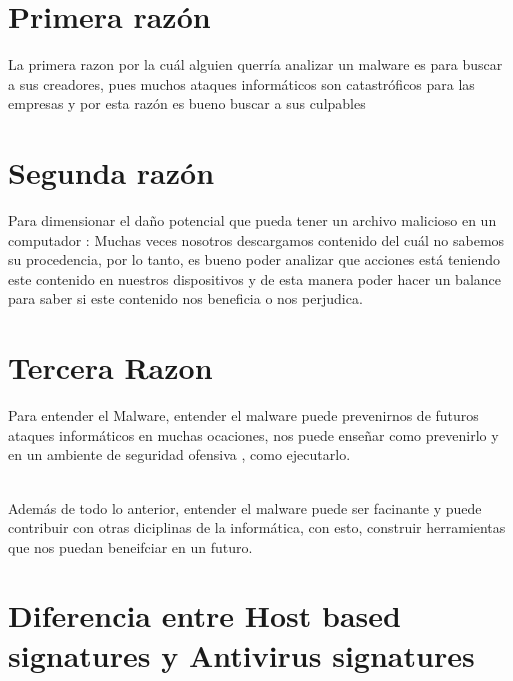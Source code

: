 \documentclass[10pt,a4paper]{article} %
\begin{document}
    \title{\rmfamily\normalfont{}}
    \author{}
    \date{\today} 
    
    \maketitle
     

    \section{Primera razón}

        La primera razon por la cuál alguien querría analizar un malware es
        para buscar a sus creadores, pues muchos ataques informáticos son
        catastróficos para las empresas y por esta razón es bueno buscar a sus
        culpables

    \section{Segunda razón}

        Para dimensionar el daño potencial que pueda tener un archivo malicioso
        en un computador : Muchas veces nosotros descargamos contenido del cuál
        no sabemos su procedencia, por lo tanto, es bueno poder analizar que
        acciones está teniendo este contenido en nuestros dispositivos y de
        esta manera poder hacer un balance para saber si este contenido nos
        beneficia o nos perjudica.

    \section{Tercera Razon}

        Para entender el Malware, entender el malware puede prevenirnos de
        futuros ataques informáticos en muchas ocaciones, nos puede enseñar
        como prevenirlo y en un ambiente de seguridad ofensiva , como
        ejecutarlo.
        
        \\ Además de todo lo anterior, entender el malware puede ser facinante
        y puede contribuir con otras diciplinas de la informática, con esto,
        construir herramientas que nos puedan beneifciar en un futuro.

    \section{Diferencia entre Host based signatures y Antivirus signatures}
\end{document}
